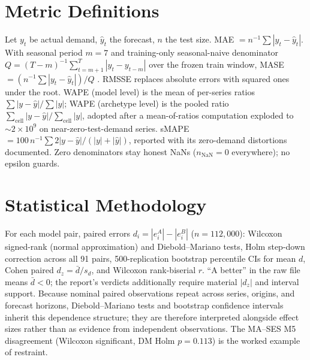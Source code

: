 \section{Metric Definitions}
\label{app:metrics}
Let $y_t$ be actual demand, $\hat y_t$ the forecast, $n$ the test size. MAE
$=n^{-1}\sum|y_t-\hat y_t|$. With seasonal period $m=7$ and training-only
seasonal-naive denominator $Q=(T-m)^{-1}\sum_{t=m+1}^{T}|y_t-y_{t-m}|$ over the
frozen train window, MASE $=(n^{-1}\sum|y_t-\hat y_t|)/Q$
\citep{hyndman2006}. RMSSE replaces absolute errors with squared ones under
the root. WAPE (model level) is the mean of per-series ratios
$\sum|y-\hat y|/\sum|y|$; WAPE (archetype level) is the pooled ratio
$\sum_{\text{cell}}|y-\hat y|/\sum_{\text{cell}}|y|$, adopted after a
mean-of-ratios computation exploded to $\sim2\times10^9$ on
near-zero-test-demand series. sMAPE $=100\,n^{-1}\sum 2|y-\hat y|/(|y|+|\hat
y|)$, reported with its zero-demand distortions documented. Zero denominators
stay honest NaNs ($n_{\text{NaN}}=0$ everywhere); no epsilon guards.

\section{Statistical Methodology}
\label{app:stats}
For each model pair, paired errors $d_i=|e^A_i|-|e^B_i|$ ($n=112{,}000$):
Wilcoxon signed-rank (normal approximation) and Diebold--Mariano
\citep{diebold1995} tests, Holm step-down correction \citep{holm1979} across
all 91 pairs, 500-replication bootstrap percentile CIs for mean $d$, Cohen
paired $d_z=\bar d/s_d$, and Wilcoxon rank-biserial $r$. ``A better'' in the
raw file means $\bar d<0$; the report's verdicts additionally require material
$|d_z|$ and interval support. Because nominal paired observations repeat across series, origins, and forecast horizons, Diebold--Mariano tests and bootstrap confidence intervals inherit this dependence structure; they are therefore interpreted alongside effect sizes rather than as evidence from independent observations. The MA--SES M5 disagreement (Wilcoxon
significant, DM Holm $p=0.113$) is the worked example of restraint.

